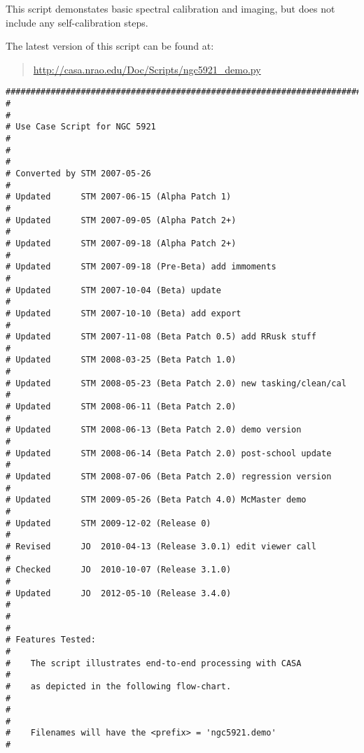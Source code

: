 This script demonstates basic spectral calibration and imaging, but
does not include any self-calibration steps.

The latest version of this script can be found at:
\begin{quote}
   \url{http://casa.nrao.edu/Doc/Scripts/ngc5921_demo.py}
\end{quote}

\small
\begin{verbatim}
##########################################################################
#                                                                        #
# Use Case Script for NGC 5921                                           #
#                                                                        #
# Converted by STM 2007-05-26                                            #
# Updated      STM 2007-06-15 (Alpha Patch 1)                            #
# Updated      STM 2007-09-05 (Alpha Patch 2+)                           #
# Updated      STM 2007-09-18 (Alpha Patch 2+)                           #
# Updated      STM 2007-09-18 (Pre-Beta) add immoments                   #
# Updated      STM 2007-10-04 (Beta) update                              #
# Updated      STM 2007-10-10 (Beta) add export                          #
# Updated      STM 2007-11-08 (Beta Patch 0.5) add RRusk stuff           #
# Updated      STM 2008-03-25 (Beta Patch 1.0)                           #
# Updated      STM 2008-05-23 (Beta Patch 2.0) new tasking/clean/cal     #
# Updated      STM 2008-06-11 (Beta Patch 2.0)                           #
# Updated      STM 2008-06-13 (Beta Patch 2.0) demo version              #
# Updated      STM 2008-06-14 (Beta Patch 2.0) post-school update        #
# Updated      STM 2008-07-06 (Beta Patch 2.0) regression version        #
# Updated      STM 2009-05-26 (Beta Patch 4.0) McMaster demo             #
# Updated      STM 2009-12-02 (Release 0)                                #
# Revised      JO  2010-04-13 (Release 3.0.1) edit viewer call           #
# Checked      JO  2010-10-07 (Release 3.1.0)                            #
# Updated      JO  2012-05-10 (Release 3.4.0)                            #
#                                                                        #
# Features Tested:                                                       #
#    The script illustrates end-to-end processing with CASA              #
#    as depicted in the following flow-chart.                            #
#                                                                        #
#    Filenames will have the <prefix> = 'ngc5921.demo'                   #

\end{verbatim}
